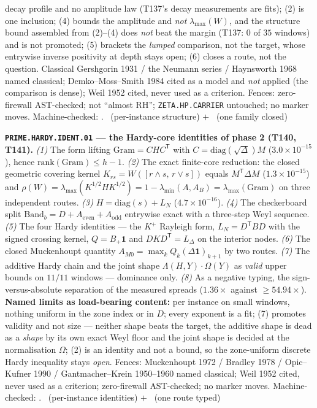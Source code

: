 \documentclass[11pt,a4paper]{article}
\begin{document}
decay profile and no amplitude law (T137's decay measurements are fits); (2) is
one inclusion; (4) bounds the amplitude and \emph{not} $\lambda_{\max}(W)$, and
the structure bound assembled from (2)--(4) does \emph{not} beat the margin
(T137: $0$ of $35$ windows) and is not promoted; (5) brackets the \emph{lumped}
comparison, not the target, whose entrywise inverse positivity at depth stays
open; (6) closes a route, not the question. Classical Gershgorin 1931 / the
Neumann series / Haynsworth 1968 named classical; Demko--Moss--Smith 1984 cited
as a model and \emph{not} applied (the comparison is dense); Weil 1952 cited,
never used as a criterion. Fences: zero-firewall AST-checked; not ``almost RH'';
\texttt{ZETA.HP.CARRIER} untouched; no marker moves.
Machine-checked: .
\mE\ (per-instance structure) $+$ \mX\ (one family closed)

\par\smallskip\noindent\textbf{\texttt{PRIME.HARDY.IDENT.01} --- the Hardy-core
identities of phase 2 (T140, T141).}
\emph{(1)} The form lifting $\mathrm{Gram}=CHC^{\mathsf T}$ with
$C=\mathrm{diag}(\sqrt\Delta)M$ ($3.0\times10^{-15}$), hence
$\mathrm{rank}(\mathrm{Gram})\le h-1$. \emph{(2)} The exact finite-core reduction:
the closed geometric covering kernel $K_{rs}=W([r\wedge s,\,r\vee s])$ equals
$M^{\mathsf T}\Delta M$ ($1.3\times10^{-15}$) and
$\rho(W)=\lambda_{\max}(K^{1/2}HK^{1/2})=1-\lambda_{\min}(A,A_B)=\lambda_{\max}(\mathrm{Gram})$
on three independent routes. \emph{(3)} $H=\mathrm{diag}(s)+L_N$
($4.7\times10^{-16}$). \emph{(4)} The checkerboard split
$\mathrm{Band}_b=D+A_{\mathrm{even}}+A_{\mathrm{odd}}$ entrywise exact with a
three-step Weyl sequence. \emph{(5)} The four Hardy identities --- the $K^{+}$
Rayleigh form, $L_N=D^{\mathsf T}BD$ with the signed crossing kernel,
$Q=B_+\mathbf 1$ and $DKD^{\mathsf T}=L_\Delta$ on the interior nodes.
\emph{(6)} The closed Muckenhoupt quantity $A_{M0}=\max_kQ_k(\Delta\mathbf 1)_{k+1}$
by two routes. \emph{(7)} The additive Hardy chain and the joint shape
$\Lambda(H,Y)\cdot\Omega(Y)$ as \emph{valid} upper bounds on $11/11$ windows ---
dominance only. \emph{(8)} As a negative typing, the sign-versus-absolute
separation of the measured spreads ($1.36\times$ against $\ge54.94\times$).
\textbf{Named limits as load-bearing content:} per instance on small windows,
nothing uniform in the zone index or in $D$; every exponent is a fit; (7) promotes
validity and not size --- neither shape beats the target, the additive shape is
dead as a \emph{shape} by its own exact Weyl floor and the joint shape is decided
at the normalisation $\Omega$; (2) is an identity and not a bound, so the
zone-uniform discrete Hardy inequality stays \emph{open}. Fences: Muckenhoupt
1972 / Bradley 1978 / Opic--Kufner 1990 / Gantmacher--Krein 1950--1960 named
classical; Weil 1952 cited, never used as a criterion; zero-firewall AST-checked;
no marker moves.
Machine-checked: .
\mE\ (per-instance identities) $+$ \mX\ (one route typed)
\end{document}
